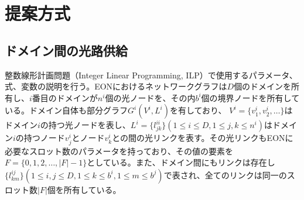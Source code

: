 \documentclass[a4j,twocolumn,fleqn]{jarticle}
\begin{document}
\section{提案方式}
%
\subsection{ドメイン間の光路供給}
整数線形計画問題（Integer Linear Programming, ILP）で使用するパラメータ、式、変数の説明を行う。EONにおけるネットワークグラフは$D$個のドメインを所有し、$i$番目のドメインが$n^i$個の光ノードを、その内$b^i$個の境界ノードを所有している。ドメイン自体も部分グラフ$G^i (V^i ,L^i)$を有しており、 $V^i = \{v^i_1,v^i_2, \dots \} $はドメイン$i$の持つ光ノードを表し、$L^i = \{l^{ii}_{jk}\}(1\leq i \leq D,1\leq j,k \leq n^i)$はドメイン$i$の持つノード$v^i_j$とノード$v^i_k$との間の光リンクを表す。その光リンクもEONに必要なスロット数のパラメータを持っており、その値の要素を$F=\{0,1,2,\dots ,|F|-1\}$としている。また、ドメイン間にもリンクは存在し$\{l^{ij}_{km}\}(1\leq i,j\leq D,1\leq k\leq b^i,1\leq m \leq b^j)$で表され、全てのリンクは同一のスロット数$|F|$個を所有している。
\end{document}
